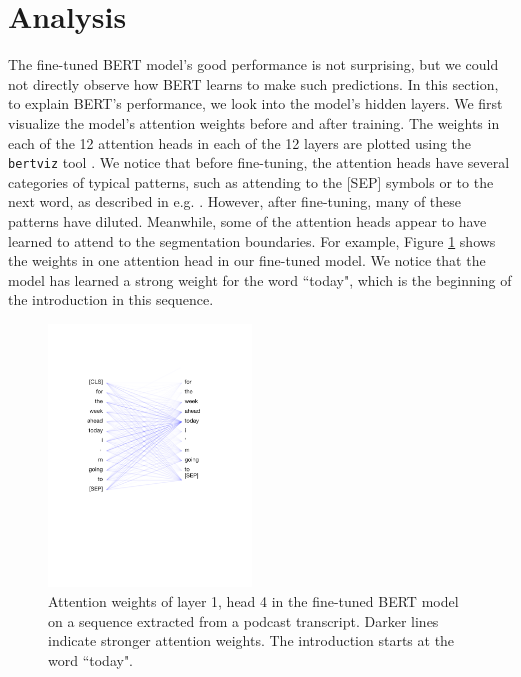 \section{Analysis} \label{sec:analysis}

The fine-tuned BERT model's good performance is not surprising, but we could not directly observe how BERT learns to make such predictions. In this section, to explain BERT's performance, we look into the model's hidden layers. We first visualize the model's attention weights before and after training. The weights in each of the 12 attention heads in each of the 12 layers are plotted using the \texttt{bertviz} tool \cite{vig2019transformervis}. We notice that before fine-tuning, the attention heads have several categories of typical patterns, such as attending to the [SEP] symbols or to the next word, as described in e.g. \citet{clark2019does}. However, after fine-tuning, many of these patterns have diluted. Meanwhile, some of the attention heads appear to have learned to attend to the segmentation boundaries. For example, Figure \ref{fig:bert_attention} shows the weights in one attention head in our fine-tuned model. We notice that the model has learned a strong weight for the word ``today", which is the beginning of the introduction in this sequence.


\begin{figure}
  \centering
    \includegraphics[width=0.48\textwidth]{paper/figs/neuron_view_bert_rm_lines.pdf}
    \vspace{-0.1in}
      \caption{Attention weights of layer 1, head 4 in the fine-tuned BERT model on a sequence extracted from a podcast transcript. Darker lines indicate stronger attention weights. The introduction starts at the word ``today".}
    \label{fig:bert_attention}
\end{figure}

